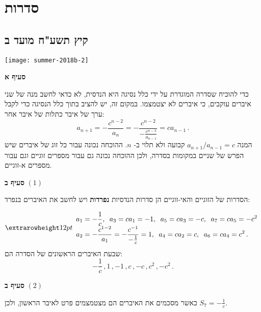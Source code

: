 

\chapter{סדרות}



\section{קיץ תשע"ח מועד ב}

\begin{center}
\texttt{[image: summer-2018b-2]}
\end{center}
\vspace{-1ex}

\textbf{סעיף א}

כדי להוכיח שסדרה המוגדרת על ידי כלל נסיגה היא הנדסית, לא כדאי לחשב מנה של שני איברים עוקבים, כי איברים לא יצטמצמו. במקום זה, יש להציב בתוך כלל הנסיגה כדי לקבל ערך של איבר כתלות של איבר אחר:
\[
a_{n+1} = -\frac{c^{n-2}}{a_n} = -\frac{c^{n-2}}{\displaystyle -\frac{c^{n-3}}{a_{n-1}}} = ca_{n-1}\,.
\]
המנה
$a_{n+1}/a_{n-1}=c$
קבועה ולא תלוי ב-%
$n$.
ההוכחה נכונה עבור כל זוג של איברים שיש הפרש של שניים במקומות בסדרה, ולכן ההוכחה נכונה גם עבור מספרים זוגיים וגם עבור מספרים א-זוגיים.

\smallskip

\textbf{סעיף ב}
$(1)$

הסדרות של הזוגיים והאי-זוגיים הן סדרות הנדסיות
\textbf{נפרדות}
ויש לחשב את האיברים בנפרד:

\vspace{-2ex}

\[
\erh{12pt}
\begin{array}{l}
a_1=-\displaystyle\frac{1}{c},\;\;a_3=ca_1=-1,\;\;a_5=ca_3=-c,\;\;a_7=ca_5=-c^2\\
a_2=\displaystyle
-\frac{c^{1-2}}{a_1}=
-\frac{c^{-1}}{-\frac{1}{c}}=1,\;\;a_4=ca_2=c,\;\;a_6=ca_4=c^2\,.
\end{array}
\]
שבעת האיברים הראשונים של הסדרה הם:
\[
-\frac{1}{c}\,,1\,, -1\,, c\,, -c\,, c^2\,, -c^2\,.
\]

\np

\textbf{סעיף ב}
$(2)$

כאשר מסכמים את האיברים הם מצטמצמים פרט לאיבר הראשון, ולכן
$S_7=-\frac{1}{c}$.

